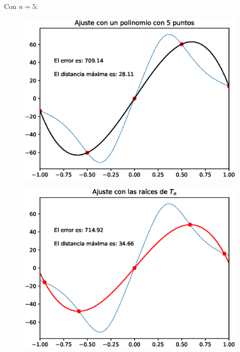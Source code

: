 Con $n = 5$:
\\
\begin{minipage}{0.45\linewidth}
    \begin{figure}[H]
    \centering
    \includegraphics[scale=0.44]{Imagenes/Interpolacion_Chebychev_05_Polinomio.eps}
    \end{figure}       
\end{minipage}
\hspace{0.1cm}
\begin{minipage}{0.45\linewidth}
\begin{figure}[H]
    \centering
    \includegraphics[scale=0.44]{Imagenes/Interpolacion_Chebychev_05_Raices.eps}
\end{figure}
\end{minipage}

